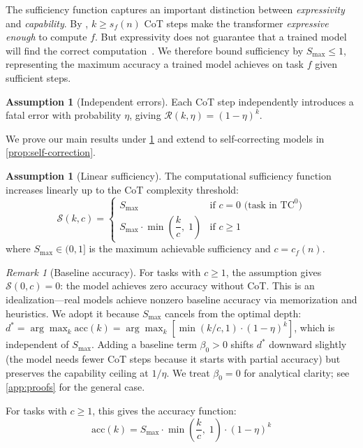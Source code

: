 \documentclass{article}
\theoremstyle{definition}
\newtheorem{assumption}[theorem]{Assumption}
\theoremstyle{remark}
\newtheorem{remark}[theorem]{Remark}
\providecommand{\TC}{\mathrm{TC}^0}
\newcommand{\depth}{d^*}       %
\newcommand{\noise}{\eta}      %
\newcommand{\acc}{\mathrm{acc}} %
\newcommand{\suf}{\mathcal{S}} %
\newcommand{\rel}{\mathcal{R}} %
\newcommand{\ccot}{c}          %
\newcommand{\Smax}{S_{\max}}   %
\begin{document}
The sufficiency function captures an important distinction between \emph{expressivity} and \emph{capability}. By \citet{li2024chain}, $k \geq s_f(n)$ CoT steps make the transformer \emph{expressive enough} to compute $f$. But expressivity does not guarantee that a trained model will find the correct computation~\cite{kim2025parity}. We therefore bound sufficiency by $\Smax \leq 1$, representing the maximum accuracy a trained model achieves on task $f$ given sufficient steps.

\begin{assumption}[Independent errors]
\label{asm:independent}
Each CoT step independently introduces a fatal error with probability $\noise$, giving $\rel(k, \noise) = (1 - \noise)^k$.
\end{assumption}

We prove our main results under \cref{asm:independent} and extend to self-correcting models in \cref{prop:self-correction}.

\begin{assumption}[Linear sufficiency]
\label{asm:linear}
The computational sufficiency function increases linearly up to the CoT complexity threshold:
\[
\suf(k, c) = \begin{cases}
\Smax & \text{if } c = 0 \text{ (task in $\TC$)} \\
\Smax \cdot \min\!\left(\dfrac{k}{c},\; 1\right) & \text{if } c \geq 1
\end{cases}
\]
where $\Smax \in (0, 1]$ is the maximum achievable sufficiency and $c = \ccot_f(n)$.
\end{assumption}

\begin{remark}[Baseline accuracy]
\label{rem:baseline}
For tasks with $c \geq 1$, the assumption gives $\suf(0, c) = 0$: the model achieves zero accuracy without CoT. This is an idealization---real models achieve nonzero baseline accuracy via memorization and heuristics. We adopt it because $\Smax$ cancels from the optimal depth: $\depth = \arg\max_k \acc(k) = \arg\max_k [\min(k/c, 1) \cdot (1-\noise)^k]$, which is independent of $\Smax$. Adding a baseline term $\beta_0 > 0$ shifts $\depth$ downward slightly (the model needs fewer CoT steps because it starts with partial accuracy) but preserves the capability ceiling at $1/\noise$. We treat $\beta_0 = 0$ for analytical clarity; see \cref{app:proofs} for the general case.
\end{remark}

For tasks with $c \geq 1$, this gives the accuracy function:
\begin{equation}
\label{eq:accuracy}
\acc(k) = \Smax \cdot \min\!\left(\frac{k}{c},\; 1\right) \cdot (1 - \noise)^k
\end{equation}
\end{document}
